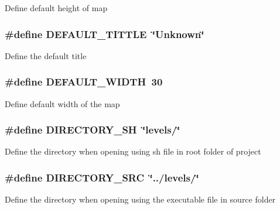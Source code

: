 Define default height of map \hypertarget{pacman-level-editor_8c_ae18ca9554768c8cc98f2a8f3212936c7}{
\subsubsection[{D\-E\-F\-A\-U\-L\-T\-\_\-\-T\-I\-T\-T\-L\-E}]{\setlength{\rightskip}{0pt plus 5cm}\#define D\-E\-F\-A\-U\-L\-T\-\_\-\-T\-I\-T\-T\-L\-E~\char`\"{}Unknown\char`\"{}}}\label{pacman-level-editor_8c_ae18ca9554768c8cc98f2a8f3212936c7}
Define the default title \hypertarget{pacman-level-editor_8c_a93493eb8fae5549bd5be67f3449245e0}{
\subsubsection[{D\-E\-F\-A\-U\-L\-T\-\_\-\-W\-I\-D\-T\-H}]{\setlength{\rightskip}{0pt plus 5cm}\#define D\-E\-F\-A\-U\-L\-T\-\_\-\-W\-I\-D\-T\-H~30}}\label{pacman-level-editor_8c_a93493eb8fae5549bd5be67f3449245e0}
Define default width of the map \hypertarget{pacman-level-editor_8c_a7a602a4376595097bdde82a739d7fc9c}{
\subsubsection[{D\-I\-R\-E\-C\-T\-O\-R\-Y\-\_\-\-S\-H}]{\setlength{\rightskip}{0pt plus 5cm}\#define D\-I\-R\-E\-C\-T\-O\-R\-Y\-\_\-\-S\-H~\char`\"{}levels/\char`\"{}}}\label{pacman-level-editor_8c_a7a602a4376595097bdde82a739d7fc9c}
Define the directory when opening using sh file in root folder of project \hypertarget{pacman-level-editor_8c_a680ab63d028a68a793615c14b807244e}{
\subsubsection[{D\-I\-R\-E\-C\-T\-O\-R\-Y\-\_\-\-S\-R\-C}]{\setlength{\rightskip}{0pt plus 5cm}\#define D\-I\-R\-E\-C\-T\-O\-R\-Y\-\_\-\-S\-R\-C~\char`\"{}../levels/\char`\"{}}}\label{pacman-level-editor_8c_a680ab63d028a68a793615c14b807244e}
Define the directory when opening using the executable file in source folder 

